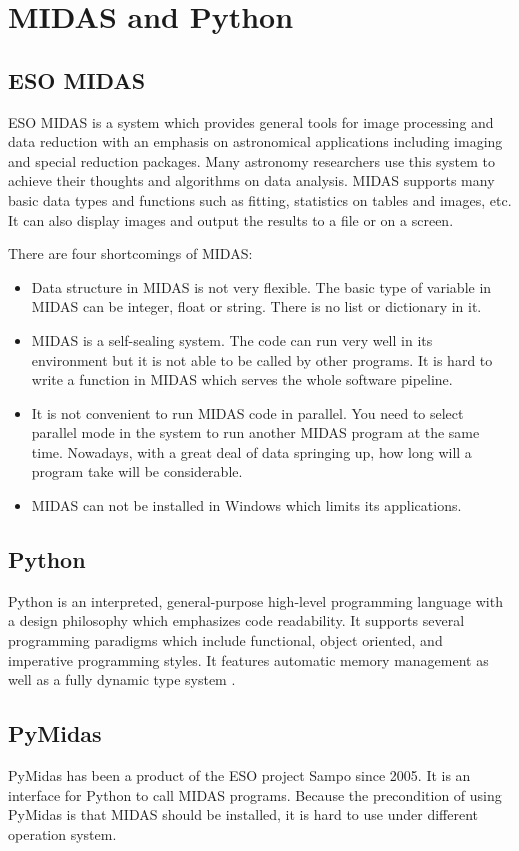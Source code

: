           \section{MIDAS and Python}
\subsection{ESO MIDAS}

ESO MIDAS is a system which provides general tools for image processing and data reduction with an emphasis on astronomical applications including imaging and special reduction packages. Many astronomy researchers use this system to achieve their thoughts and algorithms on data analysis. MIDAS supports many basic data types and functions such as fitting, statistics on tables and images, etc. It can also display images and output the results to a file or on a screen.

There are four shortcomings of MIDAS:
\begin{itemize}
  \item  Data structure in MIDAS is not very flexible. The basic type of variable in MIDAS can be integer, float or string. There is no list or dictionary in it. 
   \item  MIDAS is a self-sealing system. The code can run very well in its environment but it is not able to be called by other programs. It is hard to write a function in MIDAS which serves the whole software pipeline. 
   \item  It is not convenient to run MIDAS code  in parallel.    You need to select parallel mode in the system to run another MIDAS program at the same time. Nowadays, with a great deal of data  springing up, how long will a program take will be considerable.  
    \item MIDAS can not be installed in Windows which limits its applications. 
\end{itemize}

          \subsection{Python}
Python is an interpreted, general-purpose high-level programming language with a design philosophy which emphasizes code readability. It supports several programming paradigms which include functional, object oriented, and imperative programming styles. It features automatic memory management as well as a fully dynamic type system \citep{python_web}. 

          \subsection{PyMidas}
PyMidas has been a product of the ESO project Sampo since 2005. It is an interface for Python to call MIDAS programs. Because the precondition of using PyMidas is that MIDAS should be installed, it is hard to use under different operation system.

